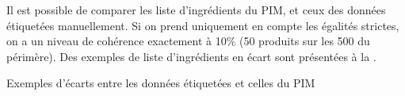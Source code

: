             Il est possible de comparer les liste d'ingrédients du PIM, et ceux des données étiquetées manuellement.
            Si on prend uniquement en compte les égalités strictes, on a un niveau de cohérence exactement à 10\% (50 produits sur les 500 du périmère).
            Des exemples de liste d'ingrédients en écart sont présentées à la .

            {\renewcommand{\arraystretch}{1.5}%
            \begin{table}[htbp]
                \begin{center}
                {\scriptsize
                
                }
                \caption{Exemples d'écarts entre les données étiquetées et celles du PIM}
                \label{tbl:ingredient_comparison}
                \end{center}
            \end{table}
            }